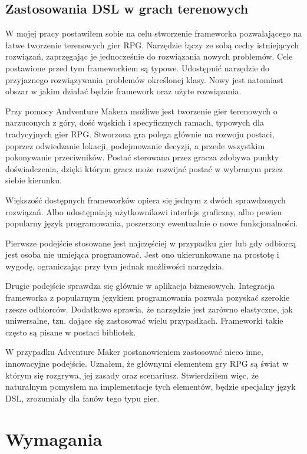 \documentclass{xmgr}
\begin{document}
\section{Zastosowania DSL w grach terenowych}

W mojej pracy postawiłem sobie na celu stworzenie frameworka pozwalającego na łatwe tworzenie terenowych gier RPG. Narzędzie łączy ze sobą cechy istniejących rozwiązań, zaprzęgając je jednocześnie do rozwiązania nowych problemów. Cele postawione przed tym frameworkiem są typowe. Udostępnić narzędzie do przyjaznego rozwiązywania problemów określonej klasy. Nowy jest natomiast obszar w jakim działać będzie framework oraz użyte rozwiązania.

Przy pomocy Andventure Makera możliwe jest tworzenie gier terenowych o narzuconych z góry, dość wąskich i specyficznych ramach, typowych dla tradycyjnych gier RPG. Stworzona gra polega głównie na rozwoju postaci, poprzez odwiedzanie lokacji, podejmowanie decyzji, a przede wszystkim pokonywanie przeciwników. Postać sterowana przez gracza zdobywa punkty doświadczenia, dzięki którym gracz może rozwijać postać w wybranym przez siebie kierunku. 

Większość dostępnych frameworków opiera się jednym z dwóch sprawdzonych rozwiązań. Albo udostępniają użytkownikowi interfejs graficzny, albo pewien popularny język programowania, poszerzony ewentualnie o nowe funkcjonalności. 

Pierwsze podejście stosowane jest najczęściej w przypadku gier lub gdy odbiorcą jest osoba nie umiejąca programować. Jest ono ukierunkowane na prostotę i wygodę, ograniczając przy tym jednak możliwości narzędzia. 

Drugie podejście sprawdza się głównie w aplikacja biznesowych. Integracja frameworka z popularnym językiem programowania pozwala pozyskać szerokie rzesze odbiorców. Dodatkowo sprawia, że narzędzie jest zarówno elastyczne, jak uniwersalne, tzn. dające się zastosować wielu przypadkach. Frameworki takie często są pisane w postaci bibliotek.

W przypadku Adventure Maker postanowieniem zastosować nieco inne, innowacyjne podejście. Uznałem, że głównymi elementem gry RPG są świat w którym się rozgrywa, jej zasady oraz scenariusz. Stwierdziłem więc, że naturalnym pomysłem na implementacje tych elementów, będzie specjalny język DSL, zrozumiały dla fanów tego typu gier.

\chapter{Wymagania}
\end{document}
